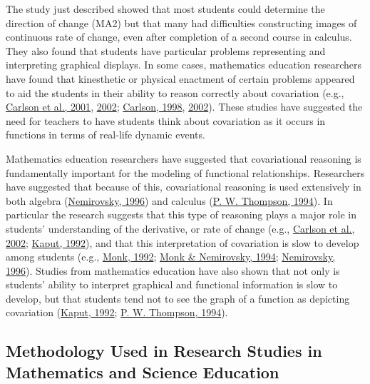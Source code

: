 \documentclass[11pt]{umnthesis}
\begin{document}
The study just described showed that most students could determine the direction of change (MA2) but that many had difficulties constructing images of continuous rate of change, even after completion of a second course in calculus. They also found that students have particular problems representing and interpreting graphical displays. In some cases, mathematics education researchers have found that kinesthetic or physical enactment of certain problems appeared to aid the students in their ability to reason correctly about covariation (e.g., \protect\hyperlink{ref-carlson:2001}{Carlson et al., 2001}, \protect\hyperlink{ref-carlson:2002}{2002}; \protect\hyperlink{ref-carlson:1998}{Carlson, 1998}, \protect\hyperlink{ref-carlson:2002a}{2002}). These studies have suggested the need for teachers to have students think about covariation as it occurs in functions in terms of real-life dynamic events.

Mathematics education researchers have suggested that covariational reasoning is fundamentally important for the modeling of functional relationships. Researchers have suggested that because of this, covariational reasoning is used extensively in both algebra (\protect\hyperlink{ref-nemirovsky:1996}{Nemirovsky, 1996}) and calculus (\protect\hyperlink{ref-thompson:1994}{P. W. Thompson, 1994}). In particular the research suggests that this type of reasoning plays a major role in students' understanding of the derivative, or rate of change (e.g., \protect\hyperlink{ref-carlson:2002}{Carlson et al., 2002}; \protect\hyperlink{ref-kaput:1992}{Kaput, 1992}), and that this interpretation of covariation is slow to develop among students (e.g., \protect\hyperlink{ref-monk:1992}{Monk, 1992}; \protect\hyperlink{ref-monk:1994}{Monk \& Nemirovsky, 1994}; \protect\hyperlink{ref-nemirovsky:1996}{Nemirovsky, 1996}). Studies from mathematics education have also shown that not only is students' ability to interpret graphical and functional information is slow to develop, but that students tend not to see the graph of a function as depicting covariation (\protect\hyperlink{ref-kaput:1992}{Kaput, 1992}; \protect\hyperlink{ref-thompson:1994}{P. W. Thompson, 1994}).

\hypertarget{methodology-used-in-research-studies-in-mathematics-and-science-education}{%
\subsection{Methodology Used in Research Studies in Mathematics and Science Education}\label{methodology-used-in-research-studies-in-mathematics-and-science-education}}
\end{document}
